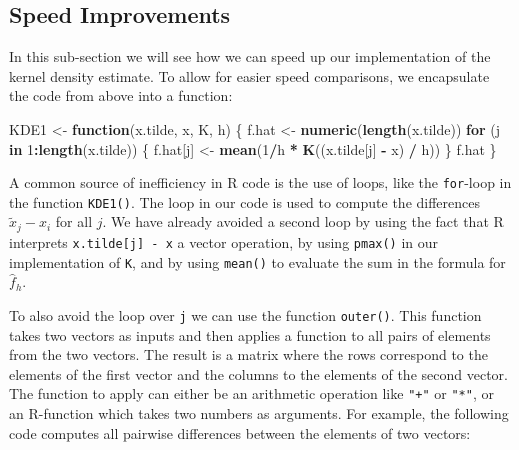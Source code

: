 \documentclass[
  a4paper,
]{article}
\newenvironment{Shaded}{\begin{snugshade}}{\end{snugshade}}
\newcommand{\ControlFlowTok}[1]{\textcolor[rgb]{0.13,0.29,0.53}{\textbf{#1}}}
\newcommand{\DecValTok}[1]{\textcolor[rgb]{0.00,0.00,0.81}{#1}}
\newcommand{\FunctionTok}[1]{\textcolor[rgb]{0.13,0.29,0.53}{\textbf{#1}}}
\newcommand{\NormalTok}[1]{#1}
\newcommand{\OtherTok}[1]{\textcolor[rgb]{0.56,0.35,0.01}{#1}}
\newcommand{\SpecialCharTok}[1]{\textcolor[rgb]{0.81,0.36,0.00}{\textbf{#1}}}
\theoremstyle{definition}
\theoremstyle{definition}
\theoremstyle{definition}
\theoremstyle{definition}
\theoremstyle{remark}
\begin{document}
\subsection*{Speed Improvements}\label{speed-improvements}

In this sub-section we will see how we can speed up our implementation
of the kernel density estimate.
To allow for easier speed comparisons, we encapsulate the code from
above into a function:

\begin{Shaded}
\begin{Highlighting}[]
\NormalTok{KDE1 }\OtherTok{\textless{}{-}} \ControlFlowTok{function}\NormalTok{(x.tilde, x, K, h) \{}
\NormalTok{  f.hat }\OtherTok{\textless{}{-}} \FunctionTok{numeric}\NormalTok{(}\FunctionTok{length}\NormalTok{(x.tilde))}
  \ControlFlowTok{for}\NormalTok{ (j }\ControlFlowTok{in} \DecValTok{1}\SpecialCharTok{:}\FunctionTok{length}\NormalTok{(x.tilde)) \{}
\NormalTok{    f.hat[j] }\OtherTok{\textless{}{-}} \FunctionTok{mean}\NormalTok{(}\DecValTok{1}\SpecialCharTok{/}\NormalTok{h }\SpecialCharTok{*} \FunctionTok{K}\NormalTok{((x.tilde[j] }\SpecialCharTok{{-}}\NormalTok{ x) }\SpecialCharTok{/}\NormalTok{ h))}
\NormalTok{  \}}
\NormalTok{  f.hat}
\NormalTok{\}}
\end{Highlighting}
\end{Shaded}

A common source of inefficiency in R code is the use of loops, like
the \texttt{for}-loop in the function \texttt{KDE1()}. The loop in our code
is used to compute the differences \(\tilde x_j - x_i\) for all \(j\).
We have already avoided a second loop by using the fact that
R interprets \texttt{x.tilde{[}j{]}\ -\ x} a vector operation, by using \texttt{pmax()}
in our implementation of \texttt{K}, and by using \texttt{mean()} to evaluate
the sum in the formula for~\(\hat f_h\).

To also avoid the loop over \texttt{j} we can use the function \texttt{outer()}. This
function takes two vectors as inputs and then applies a function to all pairs
of elements from the two vectors. The result is a matrix where the rows
correspond to the elements of the first vector and the columns to the elements
of the second vector. The function to apply can either be an arithmetic
operation like \texttt{"+"} or \texttt{"*"}, or an R-function which takes two numbers as
arguments. For example, the following code computes all pairwise differences
between the elements of two vectors:
\end{document}
